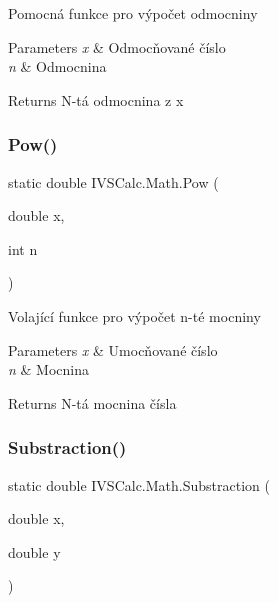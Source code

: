 Pomocná funkce pro výpočet odmocniny 


\begin{DoxyParams}{Parameters}
{\em x} & Odmocňované číslo\\
\hline
{\em n} & Odmocnina\\
\hline
\end{DoxyParams}
\begin{DoxyReturn}{Returns}
N-\/tá odmocnina z x
\end{DoxyReturn}
\mbox{\label{class_i_v_s_calc_1_1_math_a8f573242101420615d09975bea8de4f0}} 
\subsubsection{\texorpdfstring{Pow()}{Pow()}}
{\footnotesize\ttfamily static double I\+V\+S\+Calc.\+Math.\+Pow (\begin{DoxyParamCaption}\item[{double}]{x,  }\item[{int}]{n }\end{DoxyParamCaption})\hspace{0.3cm}{\ttfamily [static]}}



Volající funkce pro výpočet n-\/té mocniny 


\begin{DoxyParams}{Parameters}
{\em x} & Umocňované číslo\\
\hline
{\em n} & Mocnina\\
\hline
\end{DoxyParams}
\begin{DoxyReturn}{Returns}
N-\/tá mocnina čísla
\end{DoxyReturn}
\mbox{\label{class_i_v_s_calc_1_1_math_a466689d7dfdfcb531e4788994cb08ae6}} 
\subsubsection{\texorpdfstring{Substraction()}{Substraction()}}
{\footnotesize\ttfamily static double I\+V\+S\+Calc.\+Math.\+Substraction (\begin{DoxyParamCaption}\item[{double}]{x,  }\item[{double}]{y }\end{DoxyParamCaption})\hspace{0.3cm}{\ttfamily [static]}}



